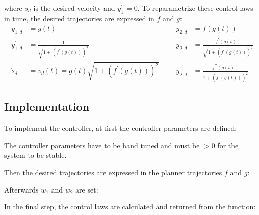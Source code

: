 \documentclass[a4paper,11pt,headings=standardclasses,parskip=half]{scrartcl}
\newcommand{\listcode}[3]{}
\newcommand{\listcodefbcontrol}[2]{\listcode{#1}{#2}{../sim/03_car_feedback_control.py}}
\begin{document}
where $\dot{s}_d$ is the desired velocity  and $y_1^{\prime\prime} = 0$.
To reparametrize these control laws in time, the desired trajectories are expressed in $f$ and $g$:
\begin{subequations}
\begin{align*}
y_{1,d} &= g(t)  &&& y_{2,d} &= f(g(t))\\
y_{1,d}^\prime &= \frac{1}{\sqrt{1+(f^{\prime }(g(t)))^2}} &&& y_{2,d}^\prime &= \frac{f^{\prime }(g(t))}{\sqrt{1+(f^{\prime }(g(t)))^2}}\\
\dot{s}_d &= v_d(t) = \dot g(t) \sqrt{1 + (f^\prime(g(t)))^2}&&& y_{2,d}^{\prime\prime} &= \frac{f^{\prime \prime}(g(t))}{1+(f^{\prime }(g(t)))^2}
\end{align*}
\end{subequations}
\subsection{Implementation}
To implement the controller, at first the controller parameters are defined:
\listcodefbcontrol{91}{94}
The controller parameters have to be hand tuned and must be $>0$ for the system to be stable.

Then the desired trajectories are expressed in the planner trajectories $f$ and $g$:
\listcodefbcontrol{103}{109}
Afterwards $w_1$ and $w_2$ are set:
\listcodefbcontrol{111}{113}
In the final step, the control laws are calculated and returned from the function:
\listcodefbcontrol{115}{120}
\end{document}
